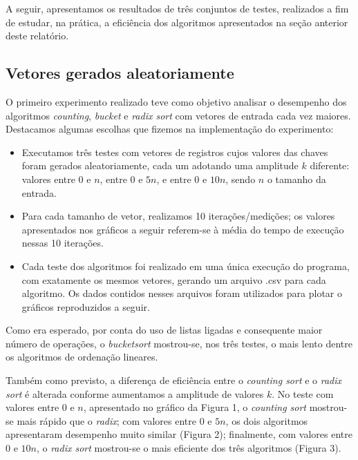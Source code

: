 \documentclass[fontsize=10pt]{article}
\begin{document}
\quad A seguir, apresentamos os resultados de três conjuntos de testes, realizados a fim de estudar, na prática, a eficiência dos algoritmos apresentados na seção anterior deste relatório.

\subsection{Vetores gerados aleatoriamente}

\quad O primeiro experimento realizado teve como objetivo analisar o desempenho dos algoritmos \textit{counting}, \textit{bucket} e \textit{radix sort} com vetores de entrada cada vez maiores. Destacamos algumas escolhas que fizemos na implementação do experimento:

\begin{itemize}
    \item Executamos três testes com vetores de registros cujos valores das chaves foram gerados aleatoriamente, cada um adotando uma amplitude $k$ diferente: valores entre 0 e $n$, entre 0 e $5n$, e entre 0 e $10n$, sendo $n$ o tamanho da entrada.
    
    \item Para cada tamanho de vetor, realizamos 10 iterações/medições; os valores apresentados nos gráficos a seguir referem-se à média do tempo de execução nessas 10 iterações.
    
    \item Cada teste dos algoritmos foi realizado em uma única execução do programa, com exatamente os mesmos vetores, gerando um arquivo .csv para cada algoritmo. Os dados contidos nesses arquivos foram utilizados para plotar o gráficos reproduzidos a seguir.
\end{itemize}

\quad Como era esperado, por conta do uso de listas ligadas e consequente maior número de operações, o \textit{bucketsort} mostrou-se, nos três testes, o mais lento dentre os algoritmos de ordenação lineares.

\quad Também como previsto, a diferença de eficiência entre o \textit{counting sort} e o \textit{radix sort} é alterada conforme aumentamos a amplitude de valores $k$. No teste com valores entre 0 e $n$, apresentado no gráfico da Figura 1, o \textit{counting sort} mostrou-se mais rápido que o \textit{radix}; com valores entre 0 e $5n$, os dois algoritmos apresentaram desempenho muito similar (Figura 2); finalmente, com valores entre 0 e $10n$, o \textit{radix sort} mostrou-se o mais eficiente dos três algoritmos (Figura 3).
\end{document}

